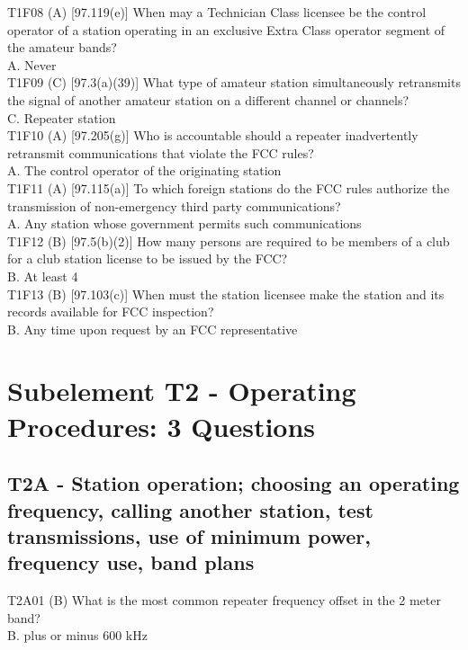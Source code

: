 \documentclass[12pt,letterpaper]{report}
\begin{document}
T1F08 (A) [97.119(e)] When may a Technician Class licensee be the control operator of a station operating in an exclusive Extra Class operator segment of the amateur bands?\\
A. Never\\

T1F09 (C) [97.3(a)(39)] What type of amateur station simultaneously retransmits the signal of another amateur station on a different channel or channels?\\
C. Repeater station\\

T1F10 (A) [97.205(g)] Who is accountable should a repeater inadvertently retransmit communications that violate the FCC rules?\\
A. The control operator of the originating station\\

T1F11 (A) [97.115(a)] To which foreign stations do the FCC rules authorize the transmission of non-emergency third party communications?\\
A. Any station whose government permits such communications\\

T1F12 (B) [97.5(b)(2)] How many persons are required to be members of a club for a club station license to be issued by the FCC?\\
B. At least 4\\

T1F13 (B) [97.103(c)] When must the station licensee make the station and its records available for FCC inspection? \\
B. Any time upon request by an FCC representative\\

\chapter{Subelement T2 - Operating Procedures: 3 Questions}
\section{T2A - Station operation; choosing an operating frequency, calling another station, test transmissions, use of minimum power, frequency use, band plans}

T2A01 (B) What is the most common repeater frequency offset in the 2 meter band?\\
B. plus or minus 600 kHz\\
\end{document}
